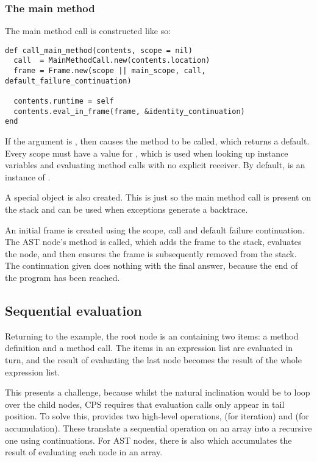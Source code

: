 \subsubsection{The main method}

The main method call is constructed like so:

\begin{minipage}{\textwidth}
\begin{lstlisting}
def call_main_method(contents, scope = nil)
  call  = MainMethodCall.new(contents.location)
  frame = Frame.new(scope || main_scope, call, default_failure_continuation)
  
  contents.runtime = self
  contents.eval_in_frame(frame, &identity_continuation)
end
\end{lstlisting}
\end{minipage}

If the  argument is , then  causes the  method to be called, which returns a default. Every scope must have a value for , which is used when looking up instance variables and evaluating method calls with no explicit receiver. By default,  is an instance of .

A special  object is also created. This is just so the main method call is present on the stack and can be used when exceptions generate a backtrace.

An initial frame is created using the scope, call and default failure continuation. The AST node's  method is called, which adds the frame to the stack, evaluates the node, and then ensures the frame is subsequently removed from the stack. The continuation given does nothing with the final answer, because the end of the program has been reached.

\subsection{Sequential evaluation}

Returning to the example, the root node is an  containing two items: a method definition and a method call. The items in an expression list are evaluated in turn, and the result of evaluating the last node becomes the result of the whole expression list.

This presents a challenge, because whilst the natural inclination would be to loop over the child nodes, CPS requires that evaluation calls only appear in tail position. To solve this,  provides two high-level operations,  (for iteration) and  (for accumulation). These translate a sequential operation on an array into a recursive one using continuations. For AST nodes, there is also  which accumulates the result of evaluating each node in an array.

